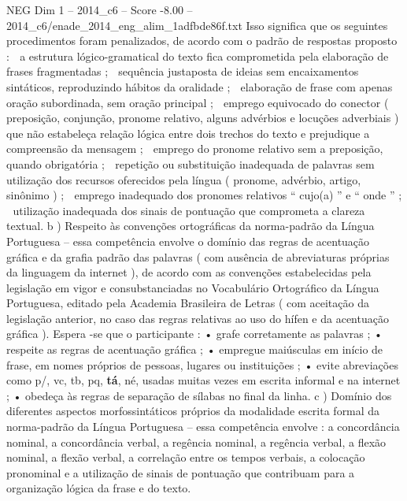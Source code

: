 \begin{textsample}{NEG Dim 1 – 2014\_c6 – Score -8.00 – 2014\_c6/enade\_2014\_eng\_alim\_1adfbde86f.txt}
Isso significa que os seguintes procedimentos foram penalizados, de acordo com o padrão de respostas proposto :  a estrutura lógico-gramatical do texto fica comprometida pela elaboração de frases fragmentadas ;  sequência justaposta de ideias sem encaixamentos sintáticos, reproduzindo hábitos da oralidade ;  elaboração de frase com apenas oração subordinada, sem oração principal ;  emprego equivocado do conector ( preposição, conjunção, pronome relativo, alguns advérbios e locuções adverbiais ) que não estabeleça relação lógica entre dois trechos do texto e prejudique a compreensão da mensagem ;  emprego do pronome relativo sem a preposição, quando obrigatória ;  repetição ou substituição inadequada de palavras sem utilização dos recursos oferecidos pela língua ( pronome, advérbio, artigo, sinônimo ) ;  emprego inadequado dos pronomes relativos “ cujo(a) ” e “ onde ” ;  utilização inadequada dos sinais de pontuação que comprometa a clareza textual. b ) Respeito às convenções ortográficas da norma-padrão da Língua Portuguesa – essa competência envolve o domínio das regras de acentuação gráfica e da grafia padrão das palavras ( com ausência de abreviaturas próprias da linguagem da internet ), de acordo com as convenções estabelecidas pela legislação em vigor e consubstanciadas no Vocabulário Ortográfico da Língua Portuguesa, editado pela Academia Brasileira de Letras ( com aceitação da legislação anterior, no caso das regras relativas ao uso do hífen e da acentuação gráfica ).
Espera -se que o participante : • grafe corretamente as palavras ; • respeite as regras de acentuação gráfica ; • empregue maiúsculas em início de frase, em nomes próprios de pessoas, lugares ou instituições ; • evite abreviações como p/, vc, tb, pq, \textbf{tá}, né, usadas muitas vezes em escrita informal e na internet ; • obedeça às regras de separação de sílabas no final da linha. c ) Domínio dos diferentes aspectos morfossintáticos próprios da modalidade escrita formal da norma-padrão da Língua Portuguesa – essa competência envolve : a concordância nominal, a concordância verbal, a regência nominal, a regência verbal, a flexão nominal, a flexão verbal, a correlação entre os tempos verbais, a colocação pronominal e a utilização de sinais de pontuação que contribuam para a organização lógica da frase e do texto.

\end{textsample}
